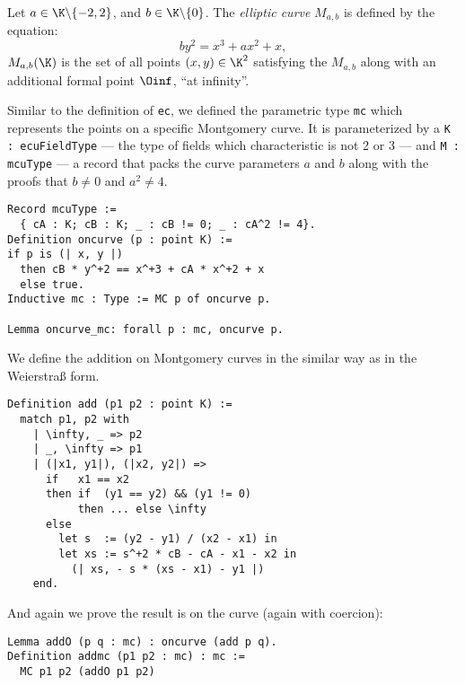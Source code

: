 \begin{dfn}
  Let $a \in \K \backslash \{-2, 2\}$, and $b \in \K \backslash \{ 0\}$.
  The \textit{elliptic curve} $M_{a,b}$ is defined by the equation:
  $$by^2 = x^3 + ax^2 + x,$$
  $M_{a,b}(\K)$ is the set of all points $(x,y) \in \K^2$ satisfying the $M_{a,b}$
  along with an additional formal point $\Oinf$, ``at infinity''.
\end{dfn}
Similar to the definition of \texttt{ec}, we defined the parametric type \texttt{mc} which
represents the points on a specific Montgomery curve.
It is parameterized by
a \texttt{K : ecuFieldType} --- the type of fields which characteristic is not
2 or 3 --- and \texttt{M : mcuType} --- a record that packs the curve
parameters $a$ and $b$ along with the proofs that $b \neq 0$ and $a^2 \neq 4$.
\begin{lstlisting}[language=Coq,belowskip=-0.1 \baselineskip]
Record mcuType :=
  { cA : K; cB : K; _ : cB != 0; _ : cA^2 != 4}.
Definition oncurve (p : point K) :=
if p is (| x, y |)
  then cB * y^+2 == x^+3 + cA * x^+2 + x
  else true.
Inductive mc : Type := MC p of oncurve p.

Lemma oncurve_mc: forall p : mc, oncurve p.
\end{lstlisting}
We define the addition on Montgomery curves in the similar way as in the Weierstra{\ss} form.
\begin{lstlisting}[language=Coq,belowskip=-0.25 \baselineskip]
Definition add (p1 p2 : point K) :=
  match p1, p2 with
    | \infty, _ => p2
    | _, \infty => p1
    | (|x1, y1|), (|x2, y2|) =>
      if   x1 == x2
      then if  (y1 == y2) && (y1 != 0)
           then ... else \infty
      else
        let s  := (y2 - y1) / (x2 - x1) in
        let xs := s^+2 * cB - cA - x1 - x2 in
          (| xs, - s * (xs - x1) - y1 |)
    end.
\end{lstlisting}
And again we prove the result is on the curve (again with coercion):
\begin{lstlisting}[language=Coq]
Lemma addO (p q : mc) : oncurve (add p q).
Definition addmc (p1 p2 : mc) : mc :=
  MC p1 p2 (addO p1 p2)
\end{lstlisting}

